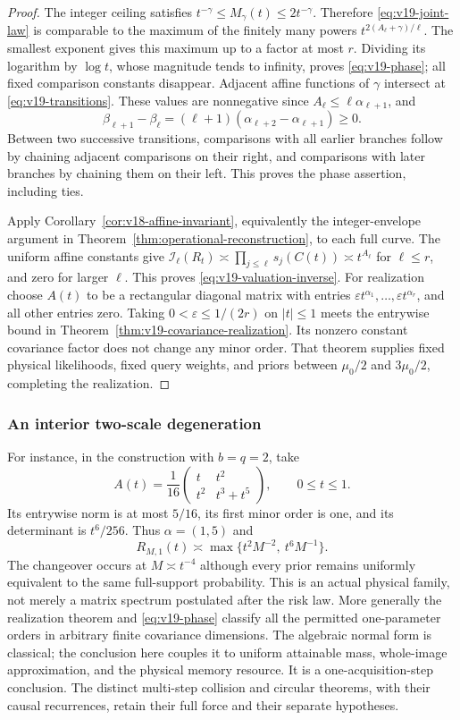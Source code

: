 \begin{proof}
The integer ceiling satisfies $t^{-\gamma}\le M_\gamma(t)
\le2t^{-\gamma}$. Therefore \eqref{eq:v19-joint-law} is comparable
to the maximum of the finitely many powers
$t^{2(A_\ell+\gamma)/\ell}$. The smallest exponent gives this
maximum up to a factor at most $r$. Dividing its logarithm by
$\log t$, whose magnitude tends to infinity, proves
\eqref{eq:v19-phase}; all fixed comparison constants disappear.
Adjacent affine functions of $\gamma$ intersect at
\eqref{eq:v19-transitions}. These values are nonnegative since
$A_\ell\le\ell\alpha_{\ell+1}$, and
\[
 \beta_{\ell+1}-\beta_\ell
       =(\ell+1)(\alpha_{\ell+2}-\alpha_{\ell+1})\ge0.
\]
Between two successive transitions, comparisons with all earlier
branches follow by chaining adjacent comparisons on their right,
and comparisons with later branches by chaining them on their left.
This proves the phase assertion, including ties.

Apply Corollary~\ref{cor:v18-affine-invariant}, equivalently the
integer-envelope argument in
Theorem~\ref{thm:operational-reconstruction}, to each full curve.
The uniform affine constants give
$\mathcal I_\ell(R_t)\asymp\prod_{j\le\ell}s_j(C(t))
\asymp t^{A_\ell}$ for $\ell\le r$, and zero for larger $\ell$.
This proves \eqref{eq:v19-valuation-inverse}. For realization choose
$A(t)$ to be a rectangular diagonal matrix with entries
$\varepsilon t^{\alpha_1},\ldots,\varepsilon t^{\alpha_r}$,
and all other entries zero. Taking $0<\varepsilon\le1/(2r)$
on $|t|\le1$ meets the entrywise bound in
Theorem~\ref{thm:v19-covariance-realization}. Its nonzero constant
covariance factor does not change any minor order. That theorem
supplies fixed physical likelihoods, fixed query weights, and priors
between $\mu_0/2$ and $3\mu_0/2$, completing the realization.
\end{proof}

\subsubsection{An interior two-scale degeneration}
For instance, in the construction with $b=q=2$, take
\[
 A(t)=\frac1{16}
 \begin{pmatrix}t&t^2\\t^2&t^3+t^5\end{pmatrix},
 \qquad 0\le t\le1.
\]
Its entrywise norm is at most $5/16$, its first minor order is one,
and its determinant is $t^6/256$. Thus $\alpha=(1,5)$ and
\[
 R_{M,1}(t)\asymp\max\{t^2M^{-2},\ t^6M^{-1}\}.
\]
The changeover occurs at $M\asymp t^{-4}$ although every prior
remains uniformly equivalent to the same full-support probability.
This is an actual physical family, not merely a matrix spectrum
postulated after the risk law. More generally the realization theorem
and \eqref{eq:v19-phase} classify all the permitted one-parameter
orders in arbitrary finite covariance dimensions. The algebraic
normal form is classical; the conclusion here couples it to uniform
attainable mass, whole-image approximation, and the physical memory
resource. It is a one-acquisition-step conclusion. The distinct
multi-step collision and circular theorems, with their causal
recurrences, retain their full force and their separate hypotheses.

